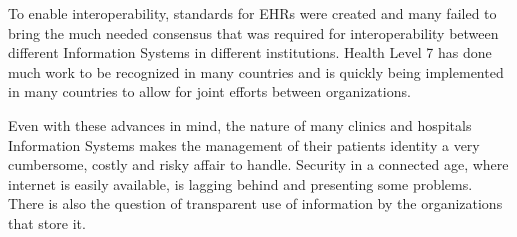 To enable interoperability, standards for EHRs were created and many failed to
bring the much needed consensus that was required for interoperability between
different Information Systems in different institutions.  \cite{Eichelberg2006}
Health Level 7 has done much work to be recognized in many countries and is
quickly being implemented in many countries to allow for joint efforts between
organizations. \cite{HL7Anual2016}

Even with these advances in mind, the nature of many clinics and hospitals
Information Systems makes the management of their patients identity a very
cumbersome, costly and risky affair to handle.  Security in a connected age,
where internet is easily available, is lagging behind and presenting some
problems.  There is also the question of transparent use of information by the
organizations that store it.
